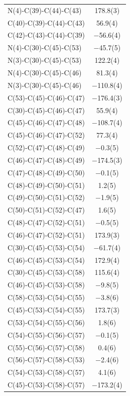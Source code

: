 \begin{center}
{\begin{supertabular}{p{1.5in}c}
N(4)-C(39)-C(44)-C(43)&178.8(3)\\
C(40)-C(39)-C(44)-C(43)&56.9(4)\\
C(42)-C(43)-C(44)-C(39)&$-$56.6(4)\\
N(4)-C(30)-C(45)-C(53)&$-$45.7(5)\\
N(3)-C(30)-C(45)-C(53)&122.2(4)\\
N(4)-C(30)-C(45)-C(46)&81.3(4)\\
N(3)-C(30)-C(45)-C(46)&$-$110.8(4)\\
C(53)-C(45)-C(46)-C(47)&$-$176.4(3)\\
C(30)-C(45)-C(46)-C(47)&55.9(4)\\
C(45)-C(46)-C(47)-C(48)&$-$108.7(4)\\
C(45)-C(46)-C(47)-C(52)&77.3(4)\\
C(52)-C(47)-C(48)-C(49)&$-$0.3(5)\\
C(46)-C(47)-C(48)-C(49)&$-$174.5(3)\\
C(47)-C(48)-C(49)-C(50)&$-$0.1(5)\\
C(48)-C(49)-C(50)-C(51)&1.2(5)\\
C(49)-C(50)-C(51)-C(52)&$-$1.9(5)\\
C(50)-C(51)-C(52)-C(47)&1.6(5)\\
C(48)-C(47)-C(52)-C(51)&$-$0.5(5)\\
C(46)-C(47)-C(52)-C(51)&173.9(3)\\
C(30)-C(45)-C(53)-C(54)&$-$61.7(4)\\
C(46)-C(45)-C(53)-C(54)&172.9(4)\\
C(30)-C(45)-C(53)-C(58)&115.6(4)\\
C(46)-C(45)-C(53)-C(58)&$-$9.8(5)\\
C(58)-C(53)-C(54)-C(55)&$-$3.8(6)\\
C(45)-C(53)-C(54)-C(55)&173.7(3)\\
C(53)-C(54)-C(55)-C(56)&1.8(6)\\
C(54)-C(55)-C(56)-C(57)&$-$0.1(5)\\
C(55)-C(56)-C(57)-C(58)&0.4(6)\\
C(56)-C(57)-C(58)-C(53)&$-$2.4(6)\\
C(54)-C(53)-C(58)-C(57)&4.1(6)\\
C(45)-C(53)-C(58)-C(57)&$-$173.2(4)\\
\end{supertabular}
}
\end{center}


